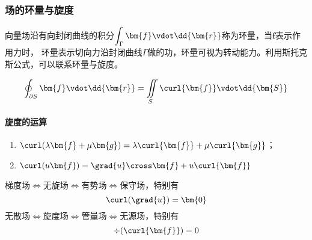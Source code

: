 \subsubsection{场的环量与旋度}
向量场沿有向封闭曲线的积分$\displaystyle\int_\Gamma \bm{f}\vdot\dd{\bm{r}}$称为环量，当$\bm{f}$表示作用力时，
环量表示切向力沿封闭曲线$\Gamma$做的功，环量可视为转动能力。利用斯托克斯公式，可以联系环量与旋度。

\[ \oint_{\partial S}\bm{f}\vdot\dd{\bm{r}} = \iint\limits_S \curl{\bm{f}}\vdot\dd{\bm{S}} \]

\paragraph{旋度的运算}
\begin{enumerate}[(1)]
    \item $\curl(\lambda\bm{f}+\mu\bm{g})=\lambda\curl{\bm{f}} + \mu\curl{\bm{g}}$；
    \item $\curl(u\bm{f})=\grad{u}\cross\bm{f} + u\curl{\bm{f}}$
\end{enumerate}

梯度场$\iff$无旋场$\iff$有势场$\iff$保守场，特别有
\[ \curl(\grad{u}) = \bm{0} \]
无散场$\iff$旋度场$\iff$管量场$\iff$无源场，特别有
\[ \div(\curl{\bm{f}}) = 0 \]
